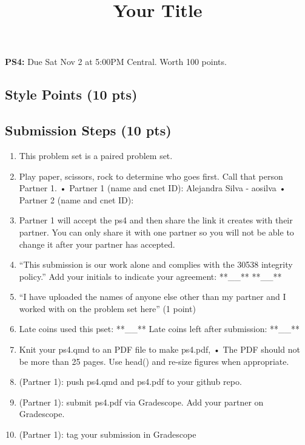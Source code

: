 \documentclass[
  letterpaper,
  DIV=11,
  numbers=noendperiod]{scrartcl}
\title{Your Title}
\author{}
\date{}
\providecommand{\tightlist}{%
  \setlength{\itemsep}{0pt}\setlength{\parskip}{0pt}}\usepackage{longtable,booktabs,array}
\begin{document}
\maketitle



\textbf{PS4:} Due Sat Nov 2 at 5:00PM Central. Worth 100 points.

\subsection{Style Points (10 pts)}\label{style-points-10-pts}

\subsection{Submission Steps (10 pts)}\label{submission-steps-10-pts}

\begin{enumerate}
\def\labelenumi{\arabic{enumi}.}
\tightlist
\item
  This problem set is a paired problem set.
\item
  Play paper, scissors, rock to determine who goes first. Call that
  person Partner 1. • Partner 1 (name and cnet ID): Alejandra Silva -
  aosilva • Partner 2 (name and cnet ID):
\item
  Partner 1 will accept the ps4 and then share the link it creates with
  their partner. You can only share it with one partner so you will not
  be able to change it after your partner has accepted.
\item
  ``This submission is our work alone and complies with the 30538
  integrity policy.'' Add your initials to indicate your agreement:
  **\_\_** **\_\_**
\item
  ``I have uploaded the names of anyone else other than my partner and I
  worked with on the problem set here'' (1 point)
\item
  Late coins used this pset: **\_\_** Late coins left after submission:
  **\_\_**
\item
  Knit your ps4.qmd to an PDF file to make ps4.pdf, • The PDF should not
  be more than 25 pages. Use head() and re-size figures when
  appropriate.
\item
  (Partner 1): push ps4.qmd and ps4.pdf to your github repo.
\item
  (Partner 1): submit ps4.pdf via Gradescope. Add your partner on
  Gradescope.
\item
  (Partner 1): tag your submission in Gradescope
\end{enumerate}
\end{document}
